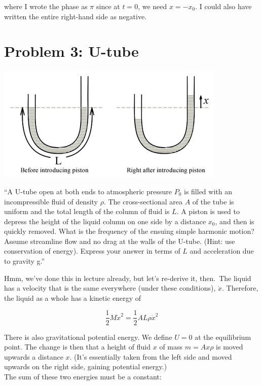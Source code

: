 \documentclass[8.01x]{subfiles}
\begin{document}
where I wrote the phase as $\pi$ since at $t = 0$, we need $x = -x_0$. I could also have written the entire right-hand side as negative.

\section{Problem 3: U-tube}

\begin{center}
\includegraphics[scale=0.7]{Graphics/h10p3}
\end{center}

``A U-tube open at both ends to atmospheric pressure $P_0$ is filled with an incompressible fluid of density $\rho$. The cross-sectional area $A$ of the tube is uniform and the total length of the column of fluid is $L$. A piston is used to depress the height of the liquid column on one side by a distance $x_0$, and then is quickly removed. What is the frequency of the ensuing simple harmonic motion? Assume streamline flow and no drag at the walls of the U-tube. (Hint: use conservation of energy). Express your answer in terms of $L$ and acceleration due to gravity g.''

Hmm, we've done this in lecture already, but let's re-derive it, then.\
The liquid has a velocity that is the same everywhere (under these conditions), $\dot{x}$. Therefore, the liquid as a whole has a kinetic energy of

\begin{equation}
\frac{1}{2} M \dot{x}^2 = \frac{1}{2} A L \rho \dot{x}^2
\end{equation}

There is also gravitational potential energy. We define $U = 0$ at the equilibrium point. The change is then that a height of fluid $x$ of mass $m = A x \rho$ is moved upwards a distance $x$. (It's essentially taken from the left side and moved upwards on the right side, gaining potential energy.)\\
The sum of these two energies must be a constant:
\end{document}
